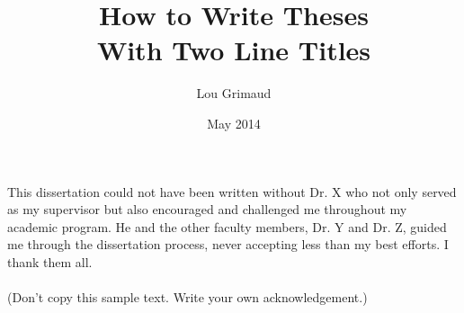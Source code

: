 \documentclass{iitthesis}
\begin{document}
\title{How to Write Theses\\
  With Two Line Titles}
\author{Lou Grimaud}
\date{May 2014}
\maketitle                %


\prelimpages         %


\begin{acknowledgement}     %
\par  This dissertation could not have been written without Dr. X
who not only served as my supervisor but also encouraged and
challenged me throughout my academic program. He and the other
faculty members, Dr. Y and Dr. Z, guided me through the
dissertation process, never accepting less than my best efforts. I
thank them all.\\ \\ (Don't copy this sample text. Write your own
acknowledgement.)
\end{acknowledgement}


\tableofcontents
\clearpage

\listoftables

\clearpage

\listoffigures

\clearpage


\listofsymbols


 \clearpage


\begin{abstract}           %
\end{abstract}
\end{document}

